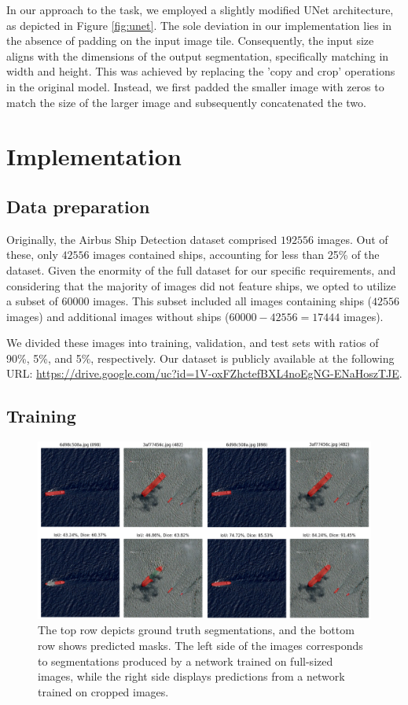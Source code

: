 \documentclass{article}
\begin{document}
In our approach to the task, we employed a slightly modified UNet architecture, as depicted in Figure \ref{fig:unet}.
The sole deviation in our implementation lies in the absence of padding on the input image tile.
Consequently, the input size aligns with the dimensions of the output segmentation, specifically
matching in width and height. This was achieved by replacing the 'copy and crop' operations in
the original model. Instead, we first padded the smaller image with zeros to match the size of the larger
image and subsequently concatenated the two.


\section{Implementation}


\subsection{Data preparation}


Originally, the Airbus Ship Detection dataset comprised \(192556\) images. Out of these, only \(42556\) images contained
ships, accounting for less than 25\% of the dataset. Given the enormity of the full dataset for our specific requirements, 
and considering that the majority of images did not feature ships, we opted to utilize a subset of \(60000\) images. This
subset included all images containing ships (\(42556\) images) and additional images without ships (\(60000 - 42556 = 17444\) images).

We divided these images into training, validation, and test sets with ratios of 90\%, 5\%, and 5\%, respectively.
Our dataset is publicly available at the following URL: \url{https://drive.google.com/uc?id=1V-oxFZhctefBXL4noEgNG-ENaHoszTJE}.


\subsection{Training}


\begin{figure}
  \centering
  \includegraphics[width=\textwidth]{comparison}
  \caption{
    The top row depicts ground truth
    segmentations, and the bottom row shows predicted masks. The left side of the
    images corresponds to segmentations produced by a network trained on full-sized
    images, while the right side displays predictions from a network trained
    on cropped images.
  }
\end{figure}
\end{document}
